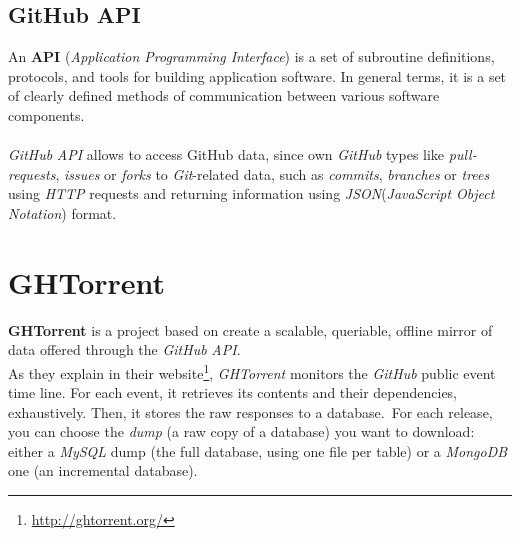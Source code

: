 \documentclass[a4paper, 12pt]{book}
\begin{document}
\subsection{GitHub API}
\label{sec_gh-api}
An \textbf{API} (\textit{Application Programming Interface}) is a set of subroutine definitions, protocols, and tools for building
application software. In general terms, it is a set of clearly defined methods of communication between various software components.\\\\
\emph{GitHub} \textit{API} allows to access GitHub data, since own \emph{GitHub} types like \textit{pull-requests}, \textit{issues} or \textit{forks}
to \emph{Git}-related data, such as \textit{commits}, \textit{branches} or \textit{trees} using \textit{HTTP} requests and
returning information using \emph{JSON}(\textit{JavaScript Object Notation}) format.
\section{GHTorrent}
\label{sec:ghtorrent}
\textbf{GHTorrent} is a project based on create a scalable, queriable, offline mirror of data offered through the \emph{GitHub} \textit{API}.\\
As they explain in their website\footnote{\url{http://ghtorrent.org/}}, \emph{GHTorrent} monitors the \emph{GitHub} public event time line.
For each event, it retrieves its contents and their dependencies, exhaustively. Then, it stores the raw responses to a database.\
For each release, you can choose the \textit{dump} (a raw copy of a database) you want to download: either a \emph{MySQL} dump
(the full database, using one file per table) or a \emph{MongoDB} one (an incremental database).\\
\end{document}

